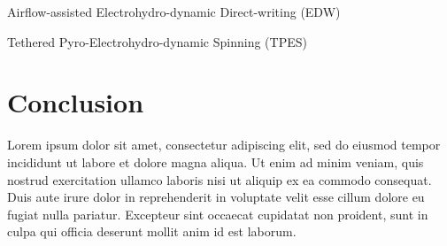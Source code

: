 \documentclass[3p,,preprint,12pt]{elsarticle}
\begin{document}
Airflow-assisted Electrohydro-dynamic Direct-writing (EDW) \unskip~\cite{527120:11974312}

Tethered Pyro-Electrohydro-dynamic Spinning (TPES) \unskip~\cite{527120:11974307}
    
\section{Conclusion}
Lorem ipsum dolor sit amet, consectetur adipiscing elit, sed do eiusmod tempor incididunt ut labore et dolore magna aliqua. Ut enim ad minim veniam, quis nostrud exercitation ullamco laboris nisi ut aliquip ex ea commodo consequat. Duis aute irure dolor in reprehenderit in voluptate velit esse cillum dolore eu fugiat nulla pariatur. Excepteur sint occaecat cupidatat non proident, sunt in culpa qui officia deserunt mollit anim id est laborum.


    






\end{document}
